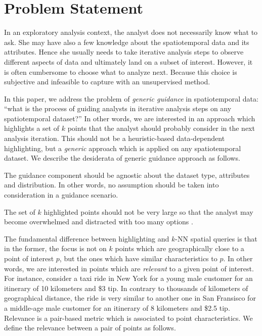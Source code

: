 \section{Problem Statement}
\label{sec:pb}
In an exploratory analysis context, the analyst does not necessarily know what to ask. She may have also a few knowledge about the spatiotemporal data and its attributes. Hence she usually needs to take iterative analysis steps to observe different aspects of data and ultimately land on a subset of interest. However, it is often cumbersome to choose what to analyze next. Because this choice is subjective and infeasible to capture with an unsupervised method.

In this paper, we address the problem of {\em generic guidance} in spatiotemporal data: ``what is the process of guiding analysts in iterative analysis steps on any spatiotemporal dataset?'' In other words, we are interested in an approach which highlights a set of $k$ points that the analyst should probably consider in the next analysis iteration. This should not be a heuristic-based data-dependent highlighting, but a {\em generic} approach which is applied on any spatiotemporal dataset. We describe the desiderata of generic guidance approach as follows.

\vspace{5pt}
 The guidance component should be agnostic about the dataset type, attributes and distribution. In other words, no assumption should be taken into consideration in a guidance scenario.

\vspace{5pt}
 The set of $k$ highlighted points should not be very large so that the analyst may become overwhelmed and distracted with too many options \cite{miller1956human}.

\vspace{5pt}
 The fundamental difference between highlighting and $k$-NN spatial queries \cite{aly2015spatial} is that in the former, the focus is not on $k$ points which are geographically close to a point of interest $p$, but the ones which have similar characteristics to $p$. In other words, we are interested in points which are {\em relevant} to a given point of interest. For instance, consider a taxi ride in New York for a young male customer for an itinerary of 10 kilometers and \$3 tip. In contrary to thousands of kilometers of geographical distance, the ride is very similar to another one in San Fransisco for a middle-age male customer for an itinerary of 8 kilometers and \$2.5 tip. Relevance is a pair-based metric which is associated to point characteristics. We define the relevance between a pair of points as follows.


